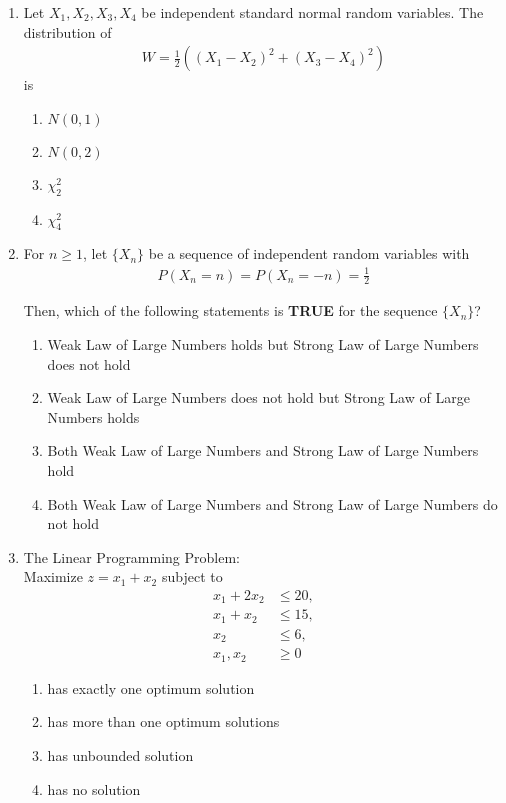 \documentclass[journal]{IEEEtran}
\numberwithin{equation}{enumi}
\numberwithin{figure}{enumi}
\begin{document}
\begin{enumerate}
\item Let $X_1, X_2, X_3, X_4$ be independent standard normal random variables.  
The distribution of
\begin{align*}
W = \frac{1}{2} \left( (X_1 - X_2)^2 + (X_3 - X_4)^2 \right)
\end{align*}
is
\hfill{}
\begin{multicols}{4}
\begin{enumerate}
    \item $N(0, 1)$
    \item $N(0, 2)$
    \item $\chi^2_2$
    \item $\chi^2_4$
\end{enumerate}
\end{multicols}




\item For $n \ge 1$, let $\{X_n\}$ be a sequence of independent random variables with
\begin{align*}
P(X_n = n) = P(X_n = -n) = \frac12
\end{align*}

Then, which of the following statements is \textbf{TRUE} for the sequence $\{X_n\}$?
\hfill{}

\begin{enumerate}
\item  Weak Law of Large Numbers holds but Strong Law of Large Numbers does not hold 
\item  Weak Law of Large Numbers does not hold but Strong Law of Large Numbers holds 
\item  Both Weak Law of Large Numbers and Strong Law of Large Numbers hold 
\item  Both Weak Law of Large Numbers and Strong Law of Large Numbers do not hold
 \end{enumerate}

\item  The Linear Programming Problem: \\
Maximize $z = x_1 + x_2$ 
subject to
\begin{align*}
x_1 + 2x_2 &\le 20, \\
x_1 + x_2 &\le 15, \\
x_2 &\le 6, \\
x_1, x_2 &\ge 0
\end{align*}
\hfill{}
\begin{multicols}{2}
\begin{enumerate}
\item  has exactly one optimum solution 
\item  has more than one optimum solutions  
\item  has unbounded solution 
\item  has no solution
\end{enumerate}
\end{multicols}



\end{enumerate}
\end{document}
